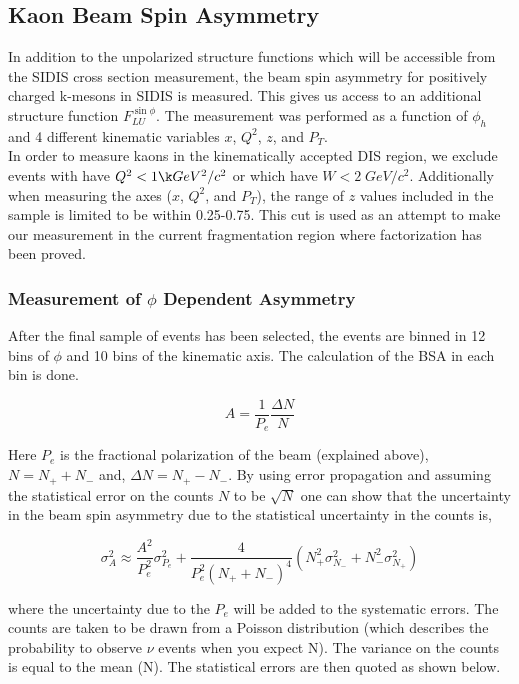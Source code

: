 \subsection{Kaon Beam Spin Asymmetry}

In addition to the unpolarized structure functions which will be accessible from the SIDIS cross section measurement, the beam spin asymmetry for positively charged k-mesons in SIDIS is measured.  This gives us access to an additional structure function $F_{LU}^{\sin\phi}$.  The measurement was performed as a function of $\phi_h$ and 4 different kinematic variables $x$, $Q^2$, $z$, and $P_T$.  \\

In order to measure kaons in the kinematically accepted DIS region, we exclude events with have $Q^2 < 1 \k GeV^2/c^2$ or which have $W < 2 \; GeV/c^2$.  Additionally when measuring the axes ($x$, $Q^2$, and $P_T$), the range of $z$ values included in the sample is limited to be within 0.25-0.75.  This cut is used as an attempt to make our measurement in the current fragmentation region where factorization has been proved.  


\subsubsection{Measurement of $\phi$ Dependent Asymmetry}
After the final sample of events has been selected, the events are binned in 12 bins of $\phi$ and 10 bins of the kinematic axis.  The calculation of the BSA in each bin is done.

\begin{equation}
  A = \frac{1}{P_e} \frac{\Delta N}{N}
\end{equation}

Here $P_e$ is the fractional polarization of the beam (explained above), $N = N_+ + N_-$ and, $\Delta N = N_+ - N_-$.  By using error propagation and assuming the statistical error on the counts $N$ to be $\sqrt{N}$ one can show that the uncertainty in the beam spin asymmetry due to the statistical uncertainty in the counts is,

\begin{equation}
  \sigma_A^2 \approx \frac{A^2}{P_e^2} \sigma_{P_e}^2 + \frac{4}{P_e^2 (N_+ + N_-)^4}(N_+^2 \sigma_{N_-}^2 + N_-^2 \sigma_{N_+}^2) 
\end{equation}

where the uncertainty due to the $P_e$ will be added to the systematic errors.  The counts are taken to be drawn from a Poisson distribution (which describes the probability to observe $\nu$ events when you expect N).  The variance on the counts is equal to the mean (N).  The statistical errors are then quoted as shown below. 

